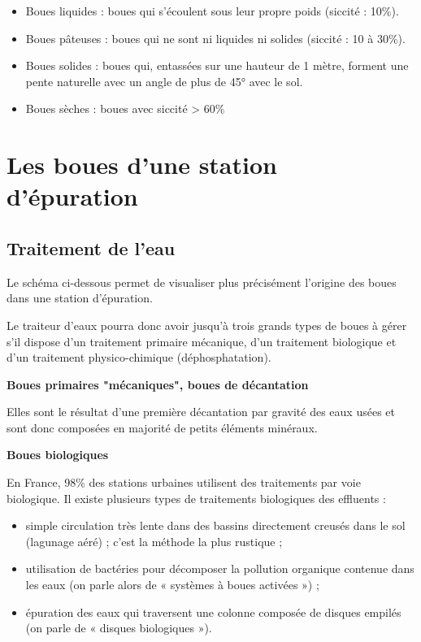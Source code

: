 \begin{itemize}
\item Boues liquides : boues qui s'écoulent sous leur propre poids (siccité : 10\%).
\item Boues pâteuses : boues qui ne sont ni liquides ni solides (siccité : 10 à 30\%).
\item Boues solides : boues qui, entassées sur une hauteur de 1 mètre, forment une pente naturelle avec un angle de plus de 45° avec le sol.
\item Boues sèches : boues avec siccité > 60\%
\end{itemize}

 
 
 
 
\section{Les boues d'une station d'épuration}

\subsection{Traitement de l'eau}

Le schéma ci-dessous permet de visualiser plus précisément l’origine des boues dans une station d’épuration.

Le traiteur d’eaux pourra donc avoir jusqu’à trois grands types de boues à gérer s’il dispose d’un traitement primaire mécanique, d’un traitement biologique et d’un traitement physico-chimique (déphosphatation).


\vspace{0.3cm}
\textbf{Boues primaires "mécaniques", boues de décantation}
\vspace{0.3cm}

Elles sont le résultat d’une première décantation par gravité des eaux usées et sont donc composées en majorité de petits éléments minéraux.

\vspace{0.3cm}


\textbf{Boues biologiques}
\vspace{0.3cm}

En France, 98\% des stations urbaines utilisent des traitements par voie biologique.
Il existe plusieurs types de traitements biologiques des effluents : 

\begin{itemize} 
\item  simple circulation très lente dans des bassins directement creusés dans le sol 
(lagunage aéré) ; c’est la méthode la plus rustique ;
\item utilisation de bactéries pour décomposer la pollution organique contenue dans les eaux (on parle alors de « systèmes à boues activées ») ;
\item  épuration des eaux qui traversent une colonne composée de disques empilés (on parle de « disques biologiques »).
\end{itemize}

